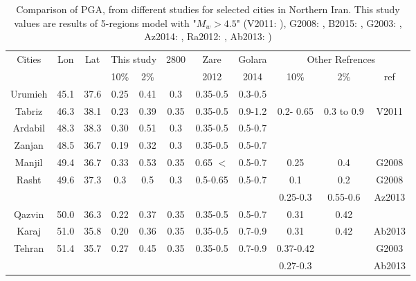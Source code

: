 \begin{table*}[!ht]
\centering
\caption{Comparison of PGA, from different studies for selected cities in Northern Iran. This study values are results of 5-regions model with "$M_w > 4.5$" (V2011:  \citet{Vafaie2011}), G2008: \citet{Ghodrati2008}, B2015: \citet{Boostan2015},  G2003:  \citet{Ghodrati2003},  Az2014: \citet{Abdollahzadeh2014a} , Ra2012: \citet{Rahgozar2012} , Ab2013: \citet{Abdi2013} ) }
\begin{tabular}{ | c | c | c | c | c | c | c | c | c | c | c |}
\hline
	\multirow{2}{*}{Cities} & \multirow{2}{*}{Lon} & \multirow{2}{*}{Lat} & \multicolumn{2}{|c|}{This study} & \multirow{2}{*}{2800} & Zare & Golara &\multicolumn{3}{|c|}{Other Refrences}    \\ 
	\cline{4-5}  \cline{9-11}  &  &  & 10\% & 2\% &  &  2012 & 2014 & 10\% & 2\% & ref \\ \hline
	 Urumieh   & 45.1   & 37.6    & 0.25 & 0.41   & 0.3 & 0.35-0.5 & 0.3-0.5 &  &  &  \\ \hline
	 Tabriz       & 46.3    & 38.1   & 0.23 & 0.39   & 0.35 & 0.35-0.5 & 0.9-1.2& 0.2- 0.65 & 0.3 to 0.9 & V2011 \\ \hline
	 Ardabil      & 48.3   & 38.3   & 0.30 & 0.51    & 0.3 & 0.35-0.5 &0.5-0.7  &&  &  \\ \hline
	 Zanjan      & 48.5   & 36.7   & 0.19 & 0.32    & 0.3 & 0.35-0.5 &0.5-0.7  &&  &  \\ \hline
	 Manjil       & 49.4   & 36.7    & 0.33 & 0.53   & 0.35 & 0.65 $<$ &0.5-0.7& 0.25 & 0.4 & G2008 \\ \hline
	  \multirow{2}{*}{Rasht}  & \multirow{2}{*}{49.6} & \multirow{2}{*}{37.3} & \multirow{2}{*}{0.3} & \multirow{2}{*}{0.5} & \multirow{2}{*}{0.3} & \multirow{2}{*}{0.5-0.65} & \multirow{2}{*}{0.5-0.7} & 0.1 &  0.2 &  G2008 \\ 
	  \cline{9-11}	             &  &  &  &  &  &  & & 0.25-0.3 & 0.55-0.6 & Az2013\\ \hline
	 Qazvin     & 50.0   & 36.3    & 0.22 & 0.37   & 0.35 & 0.35-0.5 &0.5-0.7& 0.31 & 0.42 &  \\ \hline
	 Karaj        & 51.0   & 35.8    & 0.20 & 0.36   & 0.35 & 0.35-0.5 &0.7-0.9& 0.31 & 0.42 & Ab2013 \\ \hline
	 \multirow{3}{*}{Tehran}  & \multirow{3}{*}{51.4} & \multirow{3}{*}{35.7} & \multirow{3}{*}{0.27} & \multirow{3}{*}{0.45} & \multirow{3}{*}{0.35} & \multirow{3}{*}{0.35-0.5} & \multirow{3}{*}{0.7-0.9} & 0.37-0.42 &  &  G2003 \\ 
	 \cline{9-11}	             &  &  &  &  &  &  & & 0.27-0.3  &  & Ab2013\\ 

\end{tabular}
\end{table*}
